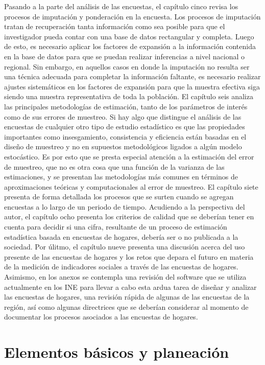 Pasando a la parte del análisis de las encuestas, el capítulo cinco revisa los procesos de imputación y ponderación en la encuesta. Los procesos de imputación tratan de recuperación tanta información como sea posible para que el investigador pueda contar con una base de datos rectangular y completa. Luego de esto, es necesario aplicar los factores de expansión a la información contenida en la base de datos para que se puedan realizar inferencias a nivel nacional o regional. Sin embargo, en aquellos casos en donde la imputación no resulta ser una técnica adecuada para completar la información faltante, es necesario realizar ajustes sistemáticos en los factores de expansión para que la muestra efectiva siga siendo una muestra representativa de toda la población. El capítulo seis analiza las principales metodologías de estimación, tanto de los parámetros de interés como de sus errores de muestreo. Si hay algo que distingue el análisis de las encuestas de cualquier otro tipo de estudio estadístico es que las propiedades importantes como insesgamiento, consistencia y eficiencia están basadas en el diseño de muestreo y no en supuestos metodológicos ligados a algún modelo estocástico. Es por esto que se presta especial atención a la estimación del error de muestreo, que no es otra cosa que una función de la varianza de las estimaciones, y se presentan las metodologías más comunes en términos de aproximaciones teóricas y computacionales al error de muestreo. El capítulo siete presenta de forma detallada los procesos que se surten cuando se agregan encuestas a lo largo de un periodo de tiempo. Acudiendo a la perspectiva del autor, el capítulo ocho presenta los criterios de calidad que se deberían tener en cuenta para decidir si una cifra, resultante de un proceso de estimación estadística basada en encuestas de hogares, debería ser o no publicada a la sociedad. Por úlitmo, el capítulo nueve presenta una discusión acerca del uso presente de las encuestas de hogares y los retos que depara el futuro en materia de la medición de indicadores sociales a través de las encuestas de hogares. Asimismo, en los anexos se contempla una revisión del software que se utiliza actualmente en los INE para llevar a cabo esta ardua tarea de diseñar y analizar las encuestas de hogares, una revisión rápida de algunas de las encuestas de la región, así como algunas directrices que se deberían considerar al momento de documentar los procesos asociados a las encuestas de hogares.

\hypertarget{elementos-basicos-y-planeacion}{%
\chapter{Elementos básicos y planeación}\label{elementos-basicos-y-planeacion}}

